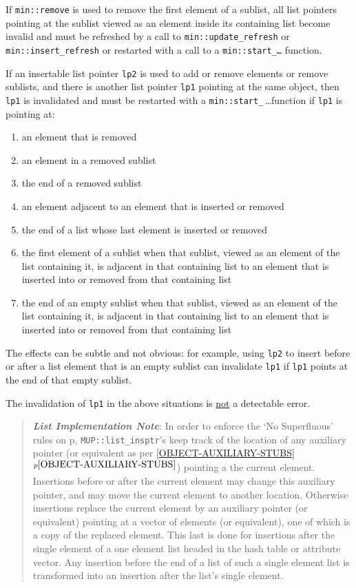 \documentclass[12pt]{article}
\newcommand{\key}[1]{{\bf \em #1}\index{#1}}
\newcommand{\itemref}[1]{\ref{#1}$^{p\pageref{#1}}$}
\newcommand{\pagref}[1]{p\pageref{#1}}
\newcommand{\EOL}{\penalty \exhyphenpenalty}
\begin{document}
If {\tt min::\EOL remove} is used to remove the first element of
a sublist,
all list pointers pointing at the sublist viewed as an element
inside its containing list
become invalid and must be refreshed by
a call to {\tt min::\EOL update\_\EOL refresh} or
{\tt min::\EOL insert\_\EOL refresh} or restarted with a call to a
{\tt min::\EOL start\_\ldots} function.

If an insertable list pointer {\tt lp2} is used to add or remove
elements or remove sublists, and there is another list pointer {\tt lp1}
pointing at the same object, then {\tt lp1} is invalidated and must
be restarted with a
{\tt min::\EOL start\_}\,\ldots function\label{RESTARTING_LIST_PTR}
if {\tt lp1} is pointing at:

\begin{enumerate}
\item an element that is removed
\item an element in a removed sublist
\item the end of a removed sublist
\item an element adjacent to an element that is inserted or removed
\item the end of a list whose last element is inserted or removed
\item the first element of a sublist
      when that sublist, viewed as an element of the list containing
      it, is adjacent in that containing list to
      an element that is inserted into or removed from that containing list
\item the end of an empty sublist
      when that sublist, viewed as an element of the list containing
      it, is adjacent in that containing list to
      an element that is inserted into or removed from that containing list
\end{enumerate}

The effects can be subtle
and not obvious: for example, using {\tt lp2} to insert before or after
a list element that is an empty sublist can invalidate {\tt lp1}
if {\tt lp1} points at the end of that empty sublist.

The invalidation of {\tt lp1} in the above situations
is \underline{not} a detectable error.

\begin{quote}
\key{List Implementation Note}:\label{LIST-IMPLEMENTATION-NOTE}
In order to enforce the `No Superfluous' rules on 
\pagref{NO-SUPERFLUOUS-LIST}, {\tt MUP::list\_insptr}'s keep
track of the location of any auxiliary pointer
(or equivalent as per \itemref{OBJECT-AUXILIARY-STUBS})
pointing a the current
element.  Insertions before or after the current element may change
this auxiliary pointer, and may move the current element to another
location.  Otherwise insertions replace the current element
by an auxiliary pointer (or equivalent)
pointing at a vector of elements (or equivalent),
one of which is a copy of the replaced element.
This last is done for insertions after the single element of a one
element list headed in the hash table or attribute vector.
Any insertion before the end of a list of such a single element list
is transformed into an insertion after the list's single element.
\end{quote}
\end{document}
